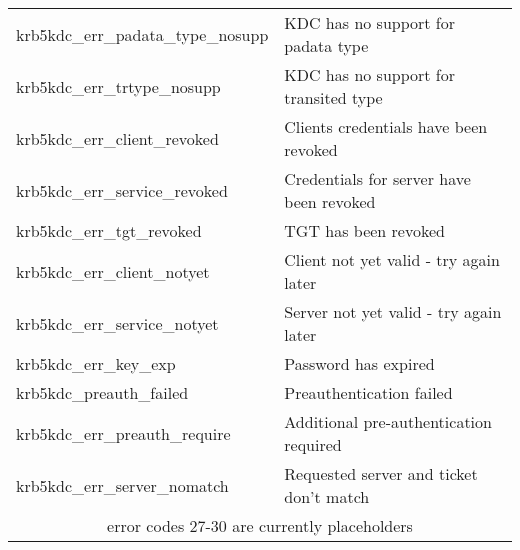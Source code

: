 \begin{small}
\begin{tabular}{ll}
{\sc krb5kdc_err_padata_type_nosupp }&  KDC has no support for padata type \\
{\sc krb5kdc_err_trtype_nosupp }& KDC has no support for transited type \\
{\sc krb5kdc_err_client_revoked }& Clients credentials have been revoked \\
{\sc krb5kdc_err_service_revoked }& Credentials for server have been revoked \\
{\sc krb5kdc_err_tgt_revoked }& TGT has been revoked \\
{\sc krb5kdc_err_client_notyet }& Client not yet valid - try again later \\
{\sc krb5kdc_err_service_notyet }& Server not yet valid - try again later \\
{\sc krb5kdc_err_key_exp }&  	 Password has expired \\
{\sc krb5kdc_preauth_failed }&  	 Preauthentication failed \\
{\sc krb5kdc_err_preauth_require }&	Additional pre-authentication required \\
{\sc krb5kdc_err_server_nomatch }&	Requested server and ticket don't match \\
\multicolumn{2}{c}{error codes 27-30 are currently placeholders}\\

\end{tabular}


\end{small}
